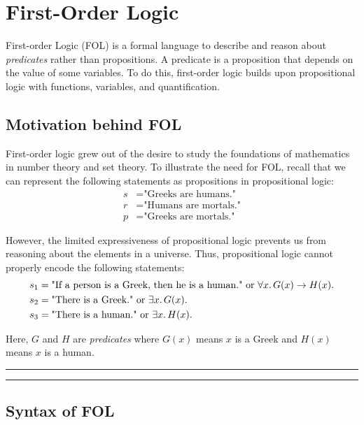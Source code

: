 \documentclass[11pt,usenames, dvipsnames]{article}
\begin{document}
\section{\large \centering First-Order Logic}
\noindent

First-order Logic (FOL) is a formal language to describe and reason about \emph{predicates} rather than propositions. A predicate is a proposition that depends on the value of some variables. To do this, first-order logic builds upon propositional logic with functions, variables, and quantification.

\subsection{\large \centering Motivation behind FOL}
\noindent

First-order logic grew out of the desire to study the foundations of mathematics in number theory and set theory. To illustrate the need for FOL, recall that we can represent the following statements as propositions in propositional logic:
\begin{align*}
  s &= \text{"Greeks are humans."}
  \\
  r &= \text{"Humans are mortals."}
  \\
  p &= \text{"Greeks are mortals."}
\end{align*}

However, the limited expressiveness of propositional logic prevents us from reasoning about the elements in a universe. Thus, propositional logic cannot properly encode the following statements:
\begin{align*}
  s_1 &= \text{"If a person is a Greek, then he is a human." or } \forall x \ldotp G(x) \rightarrow H(x).
  \\
  s_2 &= \text{"There is a Greek." or } \exists x \ldotp G(x).
  \\
  s_3 &= \text{"There is a human." or } \exists x \ldotp H(x).
\end{align*}

Here, $G$ and $H$ are \emph{predicates} where $G(x)$ means $x$ is a Greek and $H(x)$ means $x$ is a human.

\vspace{5truemm}
\hrule
\hrule

\subsection{\large \centering Syntax of FOL}
\noindent
\end{document}

